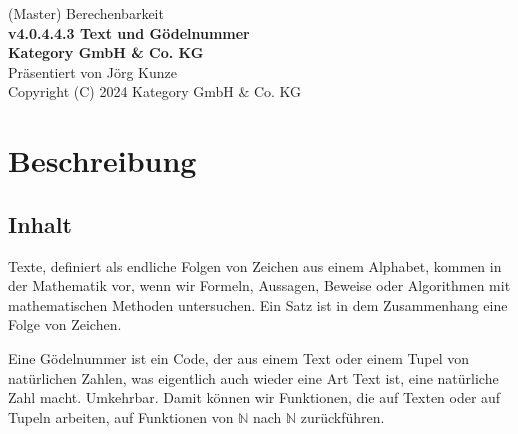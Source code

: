 \documentclass[a4paper]{amsart}
\theoremstyle{definition}
\newcommand{\N}{\ensuremath{\mathbb{ N }}}
\begin{document}
\begin{titlepage}
\centering
{\huge
(Master) Berechenbarkeit\\[1cm]
\textbf{v4.0.4.4.3 Text und Gödelnummer}
}\\[1cm]

\textbf{Kategory GmbH \& Co. KG}\\
Präsentiert von Jörg Kunze\\
Copyright (C) 2024 Kategory GmbH \& Co. KG

\end{titlepage}

%

\newpage

\section*{Beschreibung}

\subsection*{Inhalt}
Texte, definiert als endliche Folgen von Zeichen aus einem Alphabet, kommen in der Mathematik vor, wenn wir Formeln, Aussagen, Beweise oder Algorithmen mit mathematischen Methoden untersuchen. Ein Satz ist in dem Zusammenhang eine Folge von Zeichen.

Eine Gödelnummer ist ein Code, der aus einem Text oder einem Tupel von natürlichen Zahlen, was eigentlich auch wieder eine Art Text ist, eine natürliche Zahl macht. Umkehrbar. Damit können wir Funktionen, die auf Texten oder auf Tupeln arbeiten, auf Funktionen von $\N$ nach $\N$ zurückführen.
\end{document}
